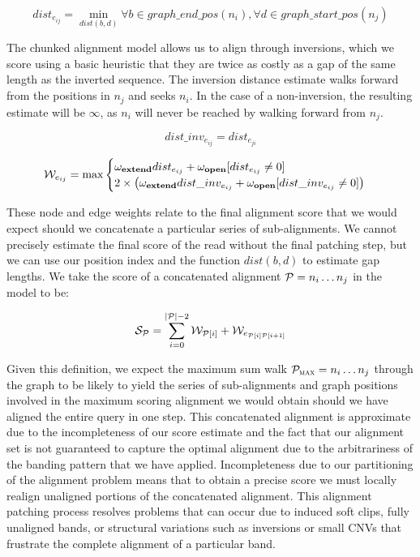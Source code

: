 \begin{equation}
  dist_{e_{ij}} = \min_{dist(b,d)} \forall b \in graph\_end\_pos(n_i), \forall d \in graph\_start\_pos(n_j)
\end{equation}

The chunked alignment model allows us to align through inversions, which we score using a basic heuristic that they are twice as costly as a gap of the same length as the inverted sequence.
The inversion distance estimate walks forward from the positions in $n_j$ and seeks $n_i$.
In the case of a non-inversion, the resulting estimate will be $\infty$, as $n_i$ will never be reached by walking forward from $n_j$.

\begin{equation}
  dist\_inv_{e_{ij}} = dist_{e_{ji}}
\end{equation}

\begin{equation}
  {\cal W}_{e_{ij}} = \max
  \begin{cases}
    \omega_\textbf{extend} dist_{e_{ij}} + \omega_\textbf{open} [dist_{e_{ij}} \ne 0] \\
    2 \times \left( \omega_\textbf{extend} dist\_inv_{e_{ij}} + \omega_\textbf{open} [dist\_inv_{e_{ij}} \ne 0] \right)
  \end{cases}
\end{equation}

These node and edge weights relate to the final alignment score that we would expect should we concatenate a particular series of sub-alignments.
We cannot precisely estimate the final score of the read without the final patching step, but we can use our position index and the function $dist(b,d)$ to estimate gap lengths.
We take the score of a concatenated alignment ${\cal P} = n_i \ldots n_j$ in the model to be:

\begin{equation}
  {\cal S}_{\cal P} = \sum_{i = 0}^{|{\cal P}|-2} {\cal W}_{{\cal P}[i]} + {\cal W}_{e_{{\cal P}[i]{\cal P}[i+1]}}
\end{equation}

Given this definition, we expect the maximum sum walk ${\cal P}_\textsc{max} = n_i \ldots n_j$ through the graph to be likely to yield the series of sub-alignments and graph positions involved in the maximum scoring alignment we would obtain should we have aligned the entire query in one step.
This concatenated alignment is approximate due to the incompleteness of our score estimate and the fact that our alignment set is not guaranteed to capture the optimal alignment due to the arbitrariness of the banding pattern that we have applied.
Incompleteness due to our partitioning of the alignment problem means that to obtain a precise score we must locally realign unaligned portions of the concatenated alignment.
This alignment patching process resolves problems that can occur due to induced soft clips, fully unaligned bands, or structural variations such as inversions or small CNVs that frustrate the complete alignment of a particular band.

